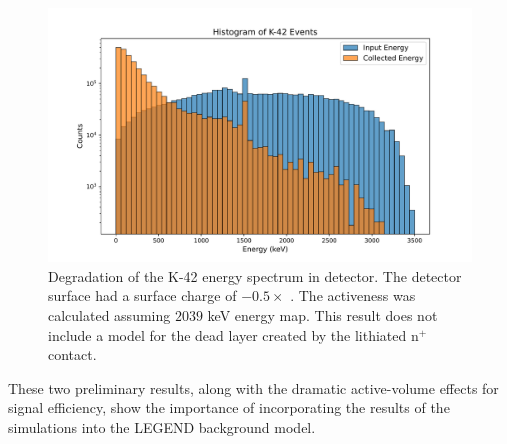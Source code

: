 \begin{figure}%
  \centering
  \includegraphics[trim={1.5cm 0.0cm 2cm 1.76cm},clip,width=0.99\linewidth]{ch5/figs/k_42_beta_spectrum.pdf}
  \caption{Degradation of the K-42 energy spectrum in {\ponama} detector. The detector surface had a surface charge of $- 0.5 \times$ {\scunit}. The activeness was calculated assuming $2039$ keV energy map. This result does not include a model for the dead layer created by the lithiated n$^+$ contact.}
  \label{ch5_figs_k_42_degrad}
\end{figure}

These two preliminary results, along with the dramatic active-volume effects for {\onbb} signal efficiency, show the importance of incorporating the results of the {\ehd} simulations into the LEGEND background model.